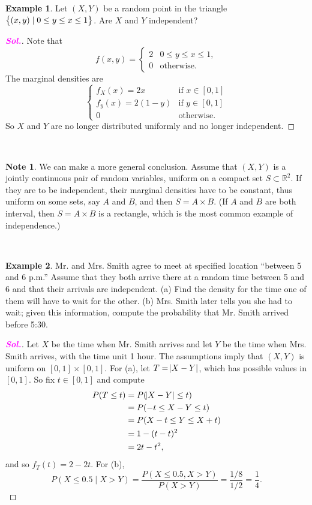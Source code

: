 \documentclass[12pt,a4paper]{article}
\theoremstyle{definition}
\newtheorem{example}{Example}[section]
\theoremstyle{definition}
\theoremstyle{definition}
\theoremstyle{definition}
\theoremstyle{remark}
\theoremstyle{definition}
\newtheorem*{note}{Note}
\newcommand{\sol}{\textcolor{magenta}{\bf \textit{Sol.}}\quad}
\begin{document}
\newpage
\begin{example}
	Let $(X,Y)$ be a random point in the triangle $\set{(x,y)\mid0\leq y\leq x\leq 1}$. Are $X$ and $Y$ independent?\begin{proof}[\sol]
		Note that \[
		f(x,y)=\begin{cases}
		2 & 0\leq y\leq x\leq 1,\\
		0 &\text{otherwise}.
		\end{cases}
		\] The marginal densities are \[
		\begin{cases}
		f_X(x)=2x &\text{if $x\in[0,1]$}\\
		f_y(x)=2(1-y) &\text{if $y\in[0,1]$}\\
		0 &\text{otherwise}.
		\end{cases}
		\] So $X$ and $Y$ are no longer distributed uniformly and no longer independent.
	\end{proof}
\end{example}
\
\begin{note}
	We can make a more general conclusion. Assume that $(X,Y)$ is a jointly continuous pair of random variables, uniform on a compact set $S\subset\mathbb{R}^2$. If they are to be independent, their marginal densities have to be constant, thus uniform on some sets, say $A$ and $B$, and then $S=A\times B$. (If $A$ and $B$ are both interval, then $S=A\times B$ is a rectangle, which is the most common example of independence.)
\end{note}
\
\begin{example}
	Mr. and Mrs. Smith agree to meet at specified location ``between 5 and 6 p.m.'' Assume that they both arrive there at a random time between 5 and 6 and that their arrivals are independent. (a) Find the density for the time one of them will have to wait for the other. (b) Mrs. Smith later tells you she had to wait; given this information, compute the probability that Mr. Smith arrived before 5:30.\begin{proof}[\sol]
		Let $X$ be the time when Mr. Smith arrives and let $Y$ be the time when Mrs. Smith arrives, with the time unit 1 hour. The assumptions imply that $(X,Y)$ is uniform on $[0,1]\times[0,1]$. For (a), let $T=\abs{X-Y}$, which has possible values in $[0,1]$. So fix $t\in[0,1]$ and compute \begin{align*}
		P(T\le t)&=P(\abs{X-Y}\leq t)\\
		&=P(-t\leq X-Y\leq t)\\
		&=P(X-t\leq Y\leq X+t)\\
		&=1-(t-t)^2\\
		&=2t-t^2,
		\end{align*} and so $f_T(t)=2-2t$. For (b), \[
		P(X\leq 0.5\mid X>Y)=\frac{P(X\leq 0.5, X>Y)}{P(X>Y)}=\frac{1/8}{1/2}=\frac{1}{4}.
		\]
	\end{proof}
\end{example}
\end{document}
